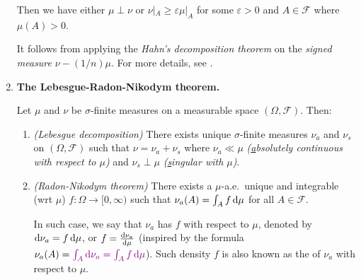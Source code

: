 \begin{enumerate}
\begin{lemma}
Then we have either \(\mu\perp\nu\) or \(\nu|_{A}\ge\varepsilon\mu|_{A}\) for
some \(\varepsilon>0\) and \(A\in\mathcal{F}\) where \(\mu(A)>0\).
\end{lemma}
\begin{pf}
It follows from applying the \emph{Hahn's decomposition theorem}
\parencite[Theorem~3.3]{folland1999real} on the \emph{signed measure}
\(\nu-(1/n)\mu\). For more details, see \textcite[Lemma~3.7]{folland1999real}.
\end{pf}
\item \textbf{The Lebesgue-Radon-Nikodym theorem.}
\begin{theorem}
\label{thm:leb-rn}
Let \(\mu\) and \(\nu\) be \(\sigma\)-finite measures on a measurable space
\((\Omega,\mathcal{F})\). Then:
\begin{enumerate}
\item \emph{(Lebesgue decomposition)} There exists unique \(\sigma\)-finite
measures \(\nu_a\) and \(\nu_s\) on \((\Omega,\mathcal{F})\) such that
\(\nu=\nu_a+\nu_s\) where \(\nu_a\ll\mu\) \emph{(\underline{a}bsolutely
continuous with respect to \(\mu\))} and \(\nu_s\perp\mu\) \emph{(\underline{s}ingular with \(\mu\))}.
\item \emph{(Radon-Nikodym theorem)} There exists a \(\mu\)-a.e.\ unique and
integrable (wrt \(\mu\)) \(f:\Omega\to[0,\infty)\) such that
\(\nu_a(A)=\int_{A}^{}f\odif{\mu}\) for all \(A\in\mathcal{F}\).

\begin{note}
In such case, we say that \(\nu_a\) has  \(f\) with respect to
\(\mu\), denoted by \(\odif{\nu_a}=f\odif{\mu}\), or \(f=\odv{\nu_a}{\mu}\)
(inspired by the formula
\(\nu_a(A)=\vc{\int_{A}^{}\odif{\nu_a}=\int_{A}^{}f\odif{\mu}}\)).  Such
density \(f\) is also known as the  of \(\nu_a\)
with respect to \(\mu\).
\end{note}
\end{enumerate}
\end{theorem}
\end{enumerate}
